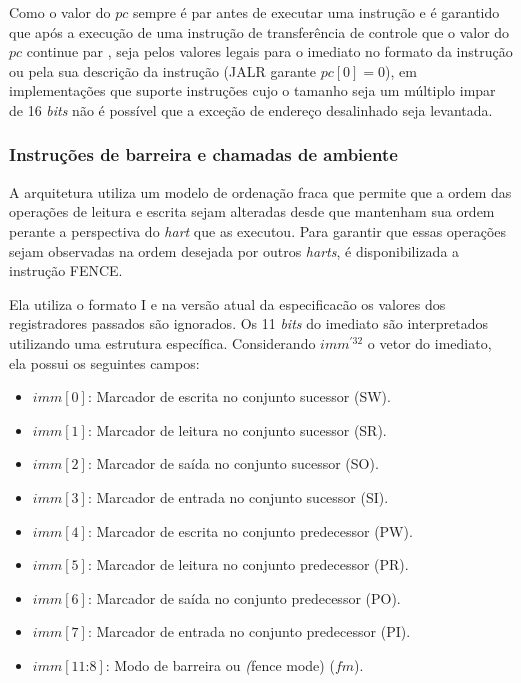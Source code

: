   Como o valor do $pc$ sempre é par antes de executar uma instrução e é garantido que após a execução 
  de uma instrução de transferência de controle que o valor do $pc$ continue par
  , seja pelos valores legais para o imediato no formato da 
  instrução ou pela sua descrição da instrução (JALR garante $pc[0] = 0$), em implementações que suporte 
  instruções cujo o tamanho seja um múltiplo impar de 16 \emph{bits} não é possível que a exceção de 
  endereço desalinhado seja levantada.

\subsubsection{Instruções de barreira e chamadas de ambiente}
\label{ssec:fs32}

  A arquitetura utiliza um modelo de ordenação fraca que permite que a ordem das operações de leitura e escrita
  sejam alteradas desde que mantenham sua ordem perante a perspectiva do \emph{hart} que as executou.
  Para garantir que essas operações sejam observadas na ordem desejada por outros \emph{harts},
  é disponibilizada a instrução FENCE.

  Ela utiliza o formato I e na versão atual da especificacão
  os valores dos registradores passados são ignorados.
  Os 11 \emph{bits} do imediato são interpretados utilizando uma estrutura específica. 
  Considerando $imm^{'32}$ o vetor do imediato, ela possui os seguintes campos:

  \begin{itemize}
    \item $imm[0]$: Marcador de escrita no conjunto sucessor (SW).
    \item $imm[1]$: Marcador de leitura no conjunto sucessor (SR).
    \item $imm[2]$: Marcador de saída no conjunto sucessor (SO).
    \item $imm[3]$: Marcador de entrada no conjunto sucessor (SI).
    \item $imm[4]$: Marcador de escrita no conjunto predecessor (PW).
    \item $imm[5]$: Marcador de leitura no conjunto predecessor (PR).
    \item $imm[6]$: Marcador de saída no conjunto predecessor (PO).
    \item $imm[7]$: Marcador de entrada no conjunto predecessor (PI).
    \item $imm[11\text{:}8]$: Modo de barreira ou \emph(fence mode) ($f\!m$).
  \end{itemize}

